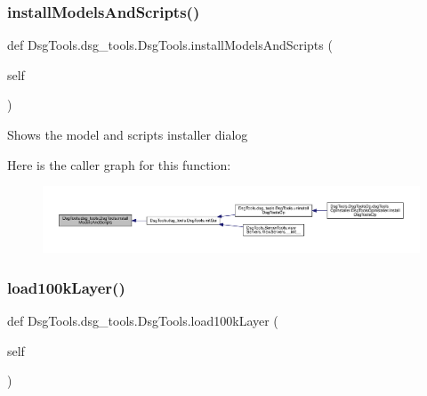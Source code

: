\subsubsection{\texorpdfstring{install\+Models\+And\+Scripts()}{installModelsAndScripts()}}
{\footnotesize\ttfamily def Dsg\+Tools.\+dsg\+\_\+tools.\+Dsg\+Tools.\+install\+Models\+And\+Scripts (\begin{DoxyParamCaption}\item[{}]{self }\end{DoxyParamCaption})}

\begin{DoxyVerb}Shows the model and scripts installer dialog
\end{DoxyVerb}
 Here is the caller graph for this function\+:
\nopagebreak
\begin{figure}[H]
\begin{center}
\leavevmode
\includegraphics[width=350pt]{class_dsg_tools_1_1dsg__tools_1_1_dsg_tools_a3487d8769e5ad8651de6d83104332d52_icgraph}
\end{center}
\end{figure}
\mbox{\label{class_dsg_tools_1_1dsg__tools_1_1_dsg_tools_a9d7bc8c97b5ed7c1758e25a4cf6695ec}} 
\subsubsection{\texorpdfstring{load100k\+Layer()}{load100kLayer()}}
{\footnotesize\ttfamily def Dsg\+Tools.\+dsg\+\_\+tools.\+Dsg\+Tools.\+load100k\+Layer (\begin{DoxyParamCaption}\item[{}]{self }\end{DoxyParamCaption})}

